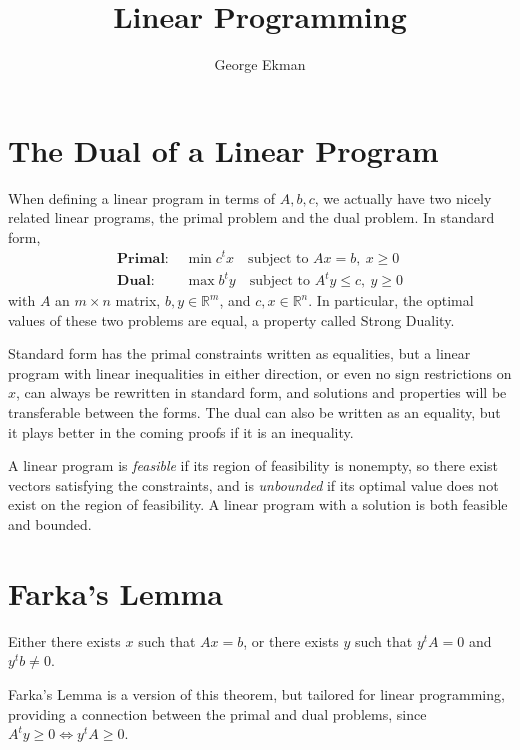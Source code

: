 \documentclass{article}
\title{Linear Programming}
\author{George Ekman}
\newcommand\R{{\mathbb{R}}}
\begin{document}
\maketitle

\section{The Dual of a Linear Program}

When defining a linear program in terms of $A, b, c$, we actually have two nicely related linear
programs, the primal problem and the dual problem. In standard form,
\begin{align*}
	\textbf{Primal: } & \min c^t x \quad \text{subject to } Ax = b,\ x \ge 0 \\
	\textbf{Dual: } & \max b^t y \quad \text{subject to } A^t y \le c,\ y \ge 0
\end{align*}
with $A$ an $m \times n$ matrix, $b, y \in \R^m$, and $c, x \in \R^n$. In particular, the
optimal values of these two problems are equal, a property called Strong Duality.

Standard form has the primal constraints written as equalities, but a linear program with linear
inequalities in either direction, or even no sign restrictions on $x$, can always be rewritten in
standard form, and solutions and properties will be transferable between the forms. The dual can
also be written as an equality, but it plays better in the coming proofs if it is an inequality.

A linear program is \emph{feasible} if its region of feasibility is nonempty, so there exist
vectors satisfying the constraints, and is \emph{unbounded} if its optimal value does not exist on
the region of feasibility. A linear program with a solution is both feasible and bounded.

\section{Farka's Lemma}

\begin{theorem}
	\label{thm:funlinalg}%
	Either there exists $x$ such that $Ax = b$, or there exists $y$ such that $y^t A = 0$ and
	$y^t b \neq 0$.
\end{theorem}

Farka's Lemma is a version of this theorem, but tailored for linear programming, providing a
connection between the primal and dual problems, since $A^t y \ge 0 \iff y^t A \ge 0$.
\end{document}
